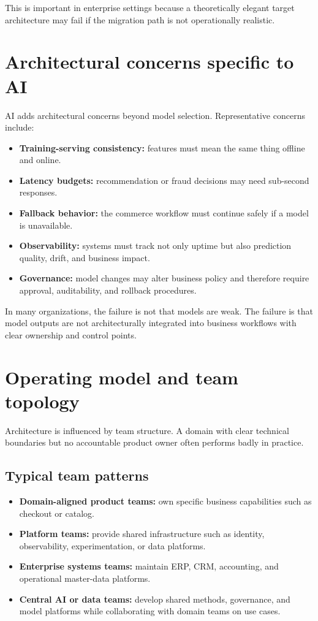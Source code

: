 This is important in enterprise settings because a theoretically elegant target architecture may fail if the migration path is not operationally realistic.

\section{Architectural concerns specific to AI}
AI adds architectural concerns beyond model selection.
Representative concerns include:
\begin{itemize}
  \item \textbf{Training-serving consistency:} features must mean the same thing offline and online.
  \item \textbf{Latency budgets:} recommendation or fraud decisions may need sub-second responses.
  \item \textbf{Fallback behavior:} the commerce workflow must continue safely if a model is unavailable.
  \item \textbf{Observability:} systems must track not only uptime but also prediction quality, drift, and business impact.
  \item \textbf{Governance:} model changes may alter business policy and therefore require approval, auditability, and rollback procedures.
\end{itemize}

In many organizations, the failure is not that models are weak.
The failure is that model outputs are not architecturally integrated into business workflows with clear ownership and control points.

\section{Operating model and team topology}
Architecture is influenced by team structure.
A domain with clear technical boundaries but no accountable product owner often performs badly in practice.

\subsection{Typical team patterns}
\begin{itemize}
  \item \textbf{Domain-aligned product teams:} own specific business capabilities such as checkout or catalog.
  \item \textbf{Platform teams:} provide shared infrastructure such as identity, observability, experimentation, or data platforms.
  \item \textbf{Enterprise systems teams:} maintain ERP, CRM, accounting, and operational master-data platforms.
  \item \textbf{Central AI or data teams:} develop shared methods, governance, and model platforms while collaborating with domain teams on use cases.
\end{itemize}

